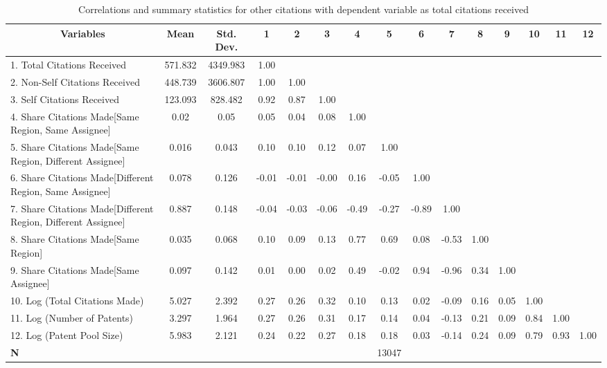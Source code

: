 \begin{sidewaystable}[htbp]\centering \caption{Correlations and summary statistics for other citations with dependent variable as total citations received \label{o.tcorrelation}}
\scriptsize
\onehalfspacing
\begin{tabular}{l  c  c  c  c  c  c  c  c  c  c  c  c  c  c }\hline\hline
\multicolumn{1}{c}{Variables} & \textbf{Mean}& \textbf{Std. Dev.}&1&2&3&4&5&6&7&8&9&10&11&12\\ \hline
1. Total Citations Received& 571.832 & 4349.983&1.00\\
2. Non-Self Citations Received& 448.739 & 3606.807&1.00&1.00\\
3. Self Citations Received & 123.093 & 828.482&0.92&0.87&1.00\\
4. Share Citations Made[Same Region, Same Assignee] & 0.02 & 0.05&0.05&0.04&0.08&1.00\\
5. Share Citations Made[Same Region, Different Assignee]& 0.016 & 0.043&0.10&0.10&0.12&0.07&1.00\\
6. Share Citations Made[Different Region, Same Assignee]& 0.078 & 0.126&-0.01&-0.01&-0.00&0.16&-0.05&1.00\\
7. Share Citations Made[Different Region, Different Assignee]& 0.887 & 0.148&-0.04&-0.03&-0.06&-0.49&-0.27&-0.89&1.00\\
8. Share Citations Made[Same Region] & 0.035 & 0.068&0.10&0.09&0.13&0.77&0.69&0.08&-0.53&1.00\\
9. Share Citations Made[Same Assignee]& 0.097 & 0.142&0.01&0.00&0.02&0.49&-0.02&0.94&-0.96&0.34&1.00\\
10. Log (Total Citations Made)& 5.027 & 2.392&0.27&0.26&0.32&0.10&0.13&0.02&-0.09&0.16&0.05&1.00\\
11. Log (Number of Patents)& 3.297 & 1.964&0.27&0.26&0.31&0.17&0.14&0.04&-0.13&0.21&0.09&0.84&1.00\\
12. Log (Patent Pool Size)& 5.983 & 2.121&0.24&0.22&0.27&0.18&0.18&0.03&-0.14&0.24&0.09&0.79&0.93&1.00\\
\hline
\textbf{N}&&&&&&&13047\\
\hline \hline 
 \end{tabular}
\end{sidewaystable}
